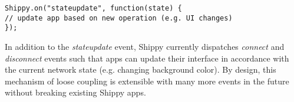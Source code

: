 \begin{lstlisting}[caption={stateupdate listener},label={lst:stateupdate}]
Shippy.on("stateupdate", function(state) {
// update app based on new operation (e.g. UI changes)
});
\end{lstlisting}

In addition to the \textit{stateupdate} event, Shippy currently dispatches \textit{connect} and \textit{disconnect} events such that apps can update their interface in accordance with the current network state (e.g. changing background color).
By design, this mechanism of loose coupling is extensible with many more events in the future without breaking existing Shippy apps.